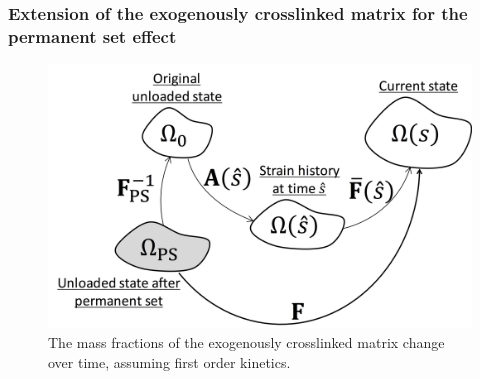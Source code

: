 \subsubsection{Extension of the exogenously crosslinked matrix for the permanent set effect}

\begin{figure}[hbt]
\centering
\includegraphics[width=0.35\paperwidth]{Images/chapter4/figure8}
\caption{The mass fractions of the exogenously crosslinked matrix change over time, assuming first order kinetics. }
\label{fig:masstransfer}
\end{figure}

